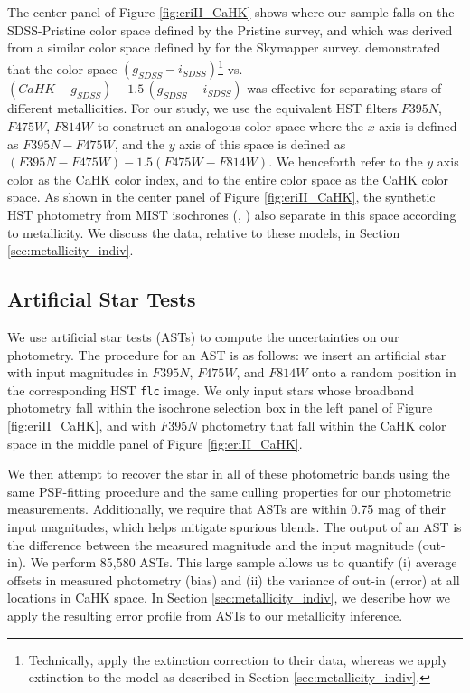 \documentclass[twocolumn]{aastex63}
\begin{document}
\par The center panel of Figure \ref{fig:eriII_CaHK} shows where our sample falls on the SDSS-Pristine color space defined by the Pristine survey, and which was derived from a similar color space defined by \citet{keller2007skymapper} for the Skymapper survey. \citet{starkenburg2017pristine} demonstrated that the color space $ (g_{SDSS} - i_{SDSS})$\footnote{Technically, \citet{starkenburg2017pristine} apply the extinction correction to their data, whereas we apply extinction to the model as described in Section \ref{sec:metallicity_indiv}.} vs. $(CaHK - g_{SDSS}) - 1.5\,(g_{SDSS} - i_{SDSS})$ was effective for separating stars of different metallicities. For our study, we use the equivalent HST filters $F395N$, $F475W$, $F814W$ to construct an analogous color space where the $x$ axis is defined as $F395N - F475W$, and the $y$ axis of this space is defined as $(F395N - F475W) - 1.5(F475W - F814W)$. We henceforth refer to the $y$ axis color as the CaHK color index, and to the entire color space as the CaHK color space. As shown in the center panel of Figure \ref{fig:eriII_CaHK}, the synthetic HST photometry from MIST isochrones  (\citealt{choi2016mist}, \citealt{dotter2016mist}) also separate in this space according to metallicity. We discuss the data, relative to these models, in Section \ref{sec:metallicity_indiv}.

\subsection{Artificial Star Tests}

\par We use artificial star tests (ASTs) to compute the uncertainties on our photometry. The procedure for an AST is as follows: we insert an artificial star with input magnitudes in $F395N$, $F475W$, and $F814W$ onto a random position in the corresponding HST \texttt{flc} image. We only input stars whose broadband photometry fall within the isochrone selection box in the left panel of Figure \ref{fig:eriII_CaHK}, and with $F395N$ photometry that fall within the CaHK color space in the middle panel of Figure \ref{fig:eriII_CaHK}. 

\par We then attempt to recover the star in all of these photometric bands using the same PSF-fitting procedure and the same culling properties for our photometric measurements. Additionally, we require that ASTs are within 0.75 mag of their input magnitudes, which helps mitigate spurious blends. The output of an AST is the difference between the measured magnitude and the input magnitude (out-in). We perform 85,580 ASTs. This large sample allows us to quantify (i) average offsets in measured photometry (bias) and (ii) the variance of out-in (error) at all locations in CaHK space. In Section \ref{sec:metallicity_indiv}, we describe how we apply the resulting error profile from ASTs to our metallicity inference.
\end{document}
